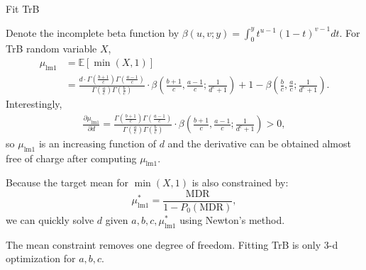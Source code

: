 \documentclass[aspectratio=169]{beamer}
\begin{document}
\begin{frame}{Fit TrB}
\begin{tiny}
Denote the incomplete beta function by $\beta(u,v;y)=\int_{0}^{y}t^{u-1}(1-t)^{v-1}dt$. For TrB random variable $X$,
\begin{equation*}
\begin{split}
\mu_{\text{lm1}} &= \mathbb{E}[\min(X, 1)] \\
&=\frac{ d \cdot  \Gamma\left(  \frac{b + 1}{c}  \right)\Gamma\left(   \frac{a-1}{c} \right)  }{\Gamma\left(    \frac{a}{c}  \right) \Gamma\left( \frac{b}{c} \right) }\cdot \beta \left( \frac{b+1}{c}  ,  \frac{a-1}{c} ;   \frac{1}{d^c+1}  \right)+1 - \beta \left( \frac{b}{c} , \frac{a}{c} ; \frac{1}{d^c+1} \right).
\end{split}
\end{equation*}\pause
Interestingly,
\begin{equation*}
\begin{split}
\frac{\partial \mu_{\text{lm1}}}{\partial d} = \frac{  \Gamma\left(  \frac{b + 1}{c}  \right)\Gamma\left(   \frac{a-1}{c} \right)  }{\Gamma\left(    \frac{a}{c}  \right) \Gamma\left( \frac{b}{c} \right) }\cdot \beta \left( \frac{b+1}{c}  ,  \frac{a-1}{c} ;   \frac{1}{d^c+1}  \right)>0,
\end{split}
\end{equation*}
so $\mu_{\text{lm1}}$ is an increasing function of $d$ and the derivative can be obtained almost free of charge after computing $\mu_{\text{lm1}}$.\medskip\pause

Because the target mean for $\min(X, 1)$ is also constrained by:
\begin{equation*}
\mu^*_{\text{lm1}} = \frac{\text{MDR}}{1 - P_0(\text{MDR})},
\end{equation*}
we can quickly solve $d$ given $a, b, c, \mu^*_{\text{lm1}}$ using Newton's method.\medskip\pause

The mean constraint removes one degree of freedom. Fitting TrB is only 3-d optimization for $a, b, c$.
\end{tiny}
\end{frame}
\end{document}
